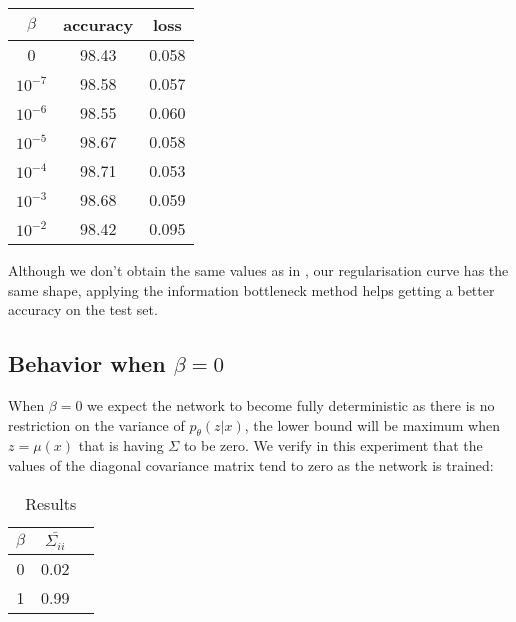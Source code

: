 \documentclass[10pt,oneside,openright]{report}
\begin{document}
    \begin{minipage}{0.3\textwidth}
        \centering
\begin{tabular}{ c | c c }
 $\beta$ & accuracy & loss\\
  \hline
0 & 98.43 & 0.058 \\
$10^{-7}$ & 98.58 & 0.057\\
$10^{-6}$ & 98.55 & 0.060\\
$10^{-5}$ & 98.67 & 0.058\\
$10^{-4}$ & 98.71 & 0.053 \\
$10^{-3}$ & 98.68 & 0.059 \\
$10^{-2}$ & 98.42 & 0.095 \\
\end{tabular}
    \end{minipage}\hfill
    \begin{minipage}{0.7\textwidth}
        \centering
{}
    \end{minipage}

Although we don't obtain the same values as in \cite{vib}, our regularisation curve has the same shape, applying the information bottleneck method helps getting a better accuracy on the test set.

\subsection{Behavior when $\beta = 0$}
When $\beta = 0$ we expect the network to become fully deterministic as there is no restriction on the variance of $p_\theta(z|x)$, the lower bound will be maximum when $z = \mu(x)$  that is having $\Sigma$ to be zero. We verify in this experiment that the values of the diagonal covariance matrix tend to zero as the network is trained:

\begin {table}[H]
\begin{center}
\begin{tabular}{ c | c c }
 $\beta$ & $\bar{\Sigma_{ii}}$ \\
 \hline
0 & 0.02\\
1 & 0.99 \\
\end{tabular}
\end{center}
\caption{Results}
\end {table}
\end{document}
